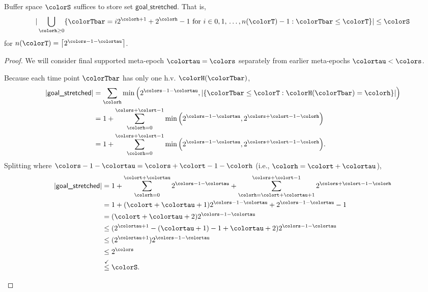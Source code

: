 \begin{lemma}
\label{thm:stretched-first-n-space}

Buffer space $\colorS$ suffices to store set $\textsf{goal\_stretched}$.
That is,
\begin{align*}
|\bigcup_{\colorh \geq 0}
\{ \colorTbar = i2^{\colorh + 1} + 2^{\colorh} - 1 \text{ for } i \in 0,1,\,\ldots,n(\colorT) - 1 : \colorTbar \leq \colorT \}| \leq \colorS
\end{align*}
for $n(\colorT) = \left\lceil 2^{\colors - 1 - \colortau} \right\rceil$.
\end{lemma}
\begin{proof}
We will consider final supported meta-epoch $\colortau=\colors$ separately from earlier meta-epochs $\colortau<\colors$.

\begin{proofpart}
Because each time point $\colorTbar$ has only one h.v. $\colorH(\colorTbar)$,
\begin{align*}
|\textsf{goal\_stretched}|
&=
\sum_{\colorh} \min\Big(2^{\colors - 1 - \colortau}, |\{ \colorTbar \leq \colorT : \colorH(\colorTbar) = \colorh \}|\Big)\\
&=
1 + \sum_{\colorh=0}^{\colors + \colort - 1} \min\Big(2^{\colors - 1 - \colortau}, 2^{\colors + \colort - 1 - \colorh}\Big)\\
&=
1 + \sum_{\colorh=0}^{\colors + \colort - 1} \min\Big(2^{\colors - 1 - \colortau}, 2^{\colors + \colort - 1 - \colorh}\Big).
\end{align*}
Splitting where $\colors - 1 - \colortau = \colors + \colort - 1 - \colorh$ (i.e., $\colorh = \colort + \colortau$),
\begin{align*}
|\textsf{goal\_stretched}|
&=
1 + \sum_{\colorh=0}^{\colort + \colortau} 2^{\colors - 1 - \colortau} + \sum_{\colorh=\colort + \colortau + 1}^{\colors + \colort - 1} 2^{\colors + \colort - 1 - \colorh}\\
&=
1 + (\colort + \colortau + 1) 2^{\colors - 1 - \colortau} + 2^{\colors - 1 - \colortau} - 1\\
&=
(\colort + \colortau + 2) 2^{\colors - 1 - \colortau}\\
&\leq
(2^{\colortau + 1} - (\colortau + 1) - 1 + \colortau + 2) 2^{\colors - 1 - \colortau}\\
&\leq
(2^{\colortau + 1}) 2^{\colors - 1 - \colortau}\\
&\leq
2^{\colors}\\
&\stackrel{\checkmark}\leq
\colorS.
\end{align*}
\end{proofpart}


\end{proof}
